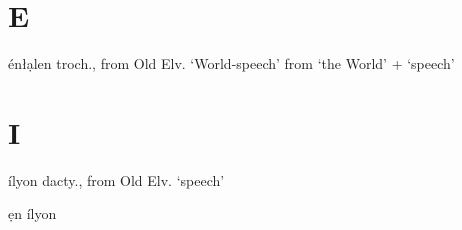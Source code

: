 \begin{multicols*}{2}

\section{E}

\begin{entrylist}
    \begin{dictentry}{énłạlen}{
        troch., from Old Elv.  `World-speech' from  `the World' +  `speech'
        }
        \label{enl:enLalen_HLM}
    \end{dictentry}
\end{entrylist}

\section{I}

\begin{entrylist}
    \begin{dictentry}{ílyon}{
        dacty., from Old Elv.  `speech'
    }
        \begin{entrysublist}
            \begin{simplentry}{ẹn ílyon}
            \end{simplentry}
        \end{entrysublist}
    \end{dictentry}
\end{entrylist}

\end{multicols*}